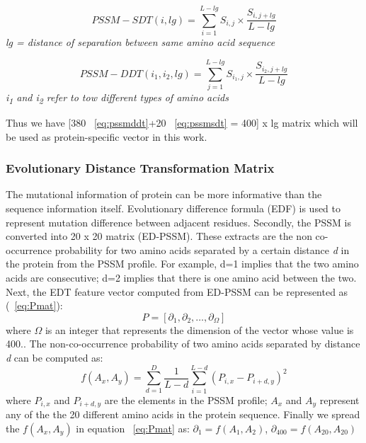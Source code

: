   \begin{equation}[H]
    PSSM-SDT(i,lg) = \sum_{i=1}^{L-lg} S_{i,j} \times \frac{ S_{i,j+lg} }{L-lg} 
    \label{eq:pssmsdt}
  \end{equation}
  \textit{\center lg =  distance of separation between same amino acid sequence}
  
  \begin{equation}[H]
    PSSM-DDT(i_1,i_2, lg) = \sum_{j=1}^{L-lg} S_{i_1,j} \times \frac{ S_{i_2,j+lg} }{ L-lg} 
    \label{eq:pssmddt}
  \end{equation}
  \textit{\centering i\textsubscript{1} and i\textsubscript{2} refer to tow different types of amino acids}
  
  Thus we have [380 ~\eqref{eq:pssmddt}+20 ~\eqref{eq:pssmsdt} = 400] x lg matrix which will be used as protein-specific vector in this work.
  
  \subsubsection{Evolutionary Distance Transformation Matrix}
  The mutational information of protein can be more informative than the sequence information itself\cite{Zhang2014}. Evolutionary difference formula (EDF) is used to represent mutation difference between adjacent residues. Secondly, the PSSM is converted into 20 x 20 matrix (ED-PSSM). These extracts are the non co-occurrence probability for two amino acids separated by a certain distance \textit{d} in the protein from the PSSM profile. For example, d=1 implies that the two amino acids are consecutive; d=2 implies that there is one amino acid between the two. Next, the EDT feature vector computed from ED-PSSM can be represented as (~\ref{eq:Pmat}): 
  \begin{equation}
    \label{eq:Pmat}
    P = [ \partial_1 ,\partial_2, \dots, \partial_\Omega]
  \end{equation}
  where $\Omega$ is an integer that represents the dimension of the vector whose value is 400.. The non-co-occurrence probability of two amino acids separated by distance \textit{d} can be computed as:
  \begin{equation}
    f(A_x,A_y) = \sum_{d=1}^{D} \frac{1}{L-d} \sum_{i=1}^{L-d} (P_{i,x} - P_{i+d,y})^2
    \label{eq:edt}
  \end{equation}
  where $P_{i,x}$ and $P_{i+d,y}$ are the elements in the PSSM profile; $A_x$ and $A_y$ represent any of the the 20 different amino acids in the protein sequence. Finally we spread the $f(A_x,A_y)$ in equation ~\ref{eq:Pmat} as:
  $ \partial_1 = f(A_1,A_2) $, 
  $ \partial_{400} = f(A_{20}, A_{20}) $
  
